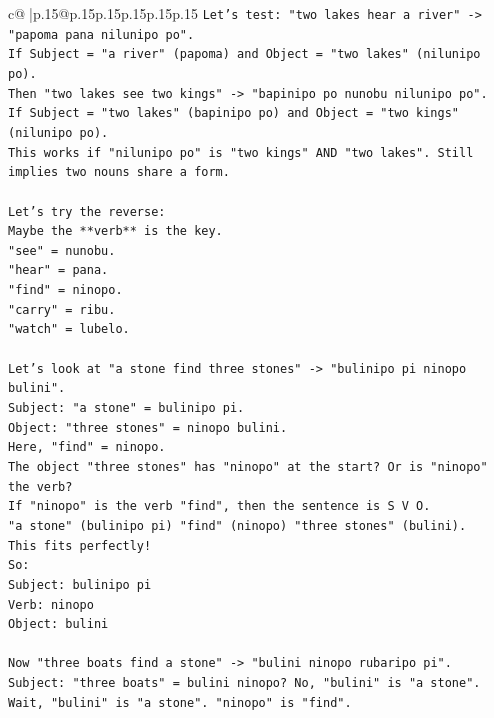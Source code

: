 \documentclass{article}
\begin{document}
{\begin{supertabular}{c@{$\;$}|p{.15\linewidth}@{}p{.15\linewidth}p{.15\linewidth}p{.15\linewidth}p{.15\linewidth}p{.15\linewidth}}
{{{\texttt{Let's test: "two lakes hear a river" {-}> "papoma pana nilunipo po".} \\
\texttt{If Subject = "a river" (papoma) and Object = "two lakes" (nilunipo po).} \\
\texttt{Then "two lakes see two kings" {-}> "bapinipo po nunobu nilunipo po".} \\
\texttt{If Subject = "two lakes" (bapinipo po) and Object = "two kings" (nilunipo po).} \\
\texttt{This works if "nilunipo po" is "two kings" AND "two lakes". Still implies two nouns share a form.} \\
\\ 
\texttt{Let's try the reverse:} \\
\texttt{Maybe the **verb** is the key.} \\
\texttt{"see" = nunobu.} \\
\texttt{"hear" = pana.} \\
\texttt{"find" = ninopo.} \\
\texttt{"carry" = ribu.} \\
\texttt{"watch" = lubelo.} \\
\\ 
\texttt{Let's look at "a stone find three stones" {-}> "bulinipo pi ninopo bulini".} \\
\texttt{Subject: "a stone" = bulinipo pi.} \\
\texttt{Object: "three stones" = ninopo bulini.} \\
\texttt{Here, "find" = ninopo.} \\
\texttt{The object "three stones" has "ninopo" at the start? Or is "ninopo" the verb?} \\
\texttt{If "ninopo" is the verb "find", then the sentence is S V O.} \\
\texttt{"a stone" (bulinipo pi) "find" (ninopo) "three stones" (bulini).} \\
\texttt{This fits perfectly!} \\
\texttt{So:} \\
\texttt{Subject: bulinipo pi} \\
\texttt{Verb: ninopo} \\
\texttt{Object: bulini} \\
\\ 
\texttt{Now "three boats find a stone" {-}> "bulini ninopo rubaripo pi".} \\
\texttt{Subject: "three boats" = bulini ninopo? No, "bulini" is "a stone".} \\
\texttt{Wait, "bulini" is "a stone". "ninopo" is "find".} \\
}}}
\end{supertabular}}
\end{document}
